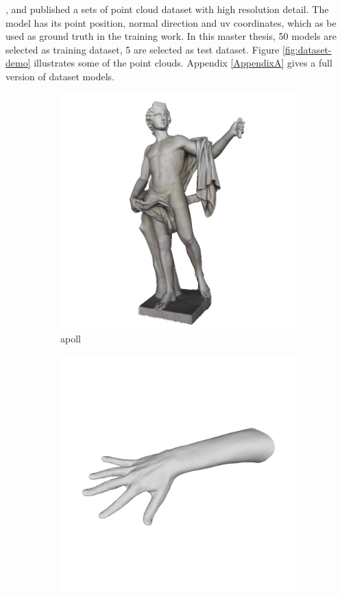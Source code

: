 \cite{data2}, \cite{data3} and \cite{data4} published a sets of point cloud dataset with high resolution detail. The model has its point position, normal direction and uv coordinates, which as be used as ground truth in the training work. In this master thesis, 50 models are selected as training dataset, 5 are selected as test dataset. Figure \ref{fig:dataset-demo} illustrates some of the point clouds. Appendix \ref{AppendixA} gives a full version of dataset models.
\begin{figure}[!h]
	\centering
	\begin{subfigure}[b]{0.23\linewidth}
		\includegraphics[width=\linewidth]{./Figures/train-dataset/00.apoll.png}
		\caption{apoll}
	\end{subfigure}
	\begin{subfigure}[b]{0.23\linewidth}
		\includegraphics[width=\linewidth]{./Figures/train-dataset/01.arm.png}

\end{subfigure}
\end{figure}
